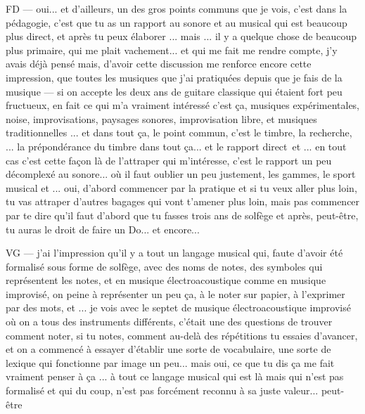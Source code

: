 FD — oui... et d'ailleurs, un des gros points communs que je vois, c'est dans la pédagogie, c'est que tu as un rapport au sonore et au musical qui est beaucoup plus direct, et après tu peux élaborer ... mais ... il y a quelque chose de beaucoup plus primaire, qui me plait vachement... et qui me fait me rendre compte, j'y avais déjà pensé mais, d'avoir cette discussion me renforce encore cette impression, que toutes les musiques que j'ai pratiquées depuis que je fais de la musique — si on accepte les deux ans de guitare classique qui étaient fort peu fructueux, en fait ce qui m'a vraiment intéressé c'est ça, musiques expérimentales, noise, improvisations, paysages sonores, improvisation libre, et musiques traditionnelles ... et dans tout ça, le point commun, c'est le timbre, la recherche, ... la prépondérance du timbre dans tout ça... et le rapport direct et ... en tout cas c'est cette façon là de l'attraper  qui m'intéresse, c'est le rapport un peu décomplexé au sonore... où il faut oublier un peu justement, les gammes, le sport musical et ... oui, d'abord commencer par la pratique et si tu veux aller plus loin, tu vas attraper d'autres bagages qui vont t'amener plus loin, mais pas commencer par te dire qu'il faut d'abord que tu fasses trois ans de solfège et après, peut-être,  tu auras le droit de faire un Do... et encore... 

VG — j'ai l'impression qu'il y a tout un langage musical qui, faute d'avoir été formalisé sous forme de solfège, avec des noms de notes, des symboles qui représentent les notes, et en musique électroacoustique comme en musique improvisé, on peine à représenter un peu ça, à le noter sur papier, à l'exprimer par des mots, et ... je vois avec le septet de musique électroacoustique improvisé où on a tous des instruments différents, c'était une des questions de trouver comment noter, si tu notes, comment au-delà des répétitions tu essaies d'avancer, et on a commencé à essayer d'établir une sorte de vocabulaire, une sorte de lexique qui fonctionne par image un peu... mais oui, ce que tu dis ça me fait vraiment penser à ça ... à tout ce langage musical qui est là mais qui n'est pas formalisé et qui du coup, n'est pas forcément reconnu à sa juste valeur... peut-être 

